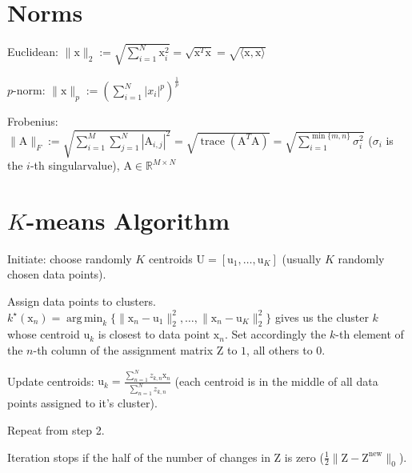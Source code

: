 \documentclass[a4paper, 11pt, landscape]{article}
\newcommand{\matr}[1]{\boldsymbol{\mathrm{#1}}}
\DeclareMathOperator*{\argmin}{arg\,min}
\begin{document}
\begin{multicols*}{3}
\section{Norms}
\begin{compactdesc}
	\item[Euclidean:] $\|\matr{x}\|_2 := \sqrt{\sum_{i=1}^{N} \matr{x}_i^2} = \sqrt{\matr{x}^T \matr{x}} = \sqrt{\langle \matr{x}, \matr{x} \rangle}$
	\item[$p$-norm:] $\|\matr{x}\|_p := \left( \sum_{i=1}^{N} |x_i|^p \right)^{\frac{1}{p}}$
	\item[Frobenius:] $\|\matr{A}\|_F :=\allowbreak \sqrt{\sum_{i=1}^{M} \sum_{j=1}^{N} |\matr{A}_{i, j}|^2} =\allowbreak \sqrt{\operatorname{trace}(\matr{A}^T \matr{A})} =\allowbreak \sqrt{\sum_{i=1}^{\min\{m, n\}} \sigma_i^2}$ ($\sigma_i$ is the $i$-th singularvalue), $\matr{A} \in \mathbb{R}^{M \times N}$
\end{compactdesc}

\section{$K$-means Algorithm}
\begin{compactenum}
	\item Initiate: choose randomly $K$ centroids $\matr{U} = [\matr{u}_1, \ldots, \matr{u}_K]$ (usually $K$ randomly chosen data points).
	\item Assign data points to clusters. $k^\star(\matr{x}_n) = \argmin_k \{ \|\matr{x}_n - \matr{u}_1\|_2^2, \ldots, \|\matr{x}_n - \matr{u}_K\|_2^2 \}$ gives us the cluster $k$ whose centroid $\matr{u}_k$ is closest to data point $\matr{x}_n$. Set accordingly the $k$-th element of the $n$-th column of the assignment matrix $\matr{Z}$ to $1$, all others to $0$.
	\item Update centroids: $\matr{u}_k = \frac{\sum_{n=1}^N z_{k,n} \matr{x}_n}{\sum_{n=1}^N z_{k,n}}$ (each centroid is in the middle of all data points assigned to it's cluster).
	\item Repeat from step 2.
\end{compactenum}
Iteration stops if the half of the number of changes in $\matr{Z}$ is zero ($\frac{1}{2} \|\matr{Z} - \matr{Z}^\text{new}\|_0$).


\end{multicols*}
\end{document}

